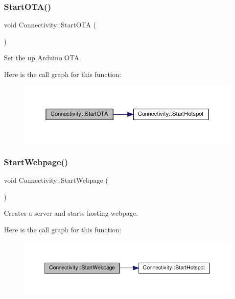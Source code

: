 \subsubsection{\texorpdfstring{Start\+O\+T\+A()}{StartOTA()}}
{\footnotesize\ttfamily void Connectivity\+::\+Start\+O\+TA (\begin{DoxyParamCaption}{ }\end{DoxyParamCaption})}



Set the up Arduino O\+TA. 

Here is the call graph for this function\+:
\nopagebreak
\begin{figure}[H]
\begin{center}
\leavevmode
\includegraphics[width=350pt]{classConnectivity_a08efeeef7c1096e4244224846f70f04c_cgraph}
\end{center}
\end{figure}
\mbox{\label{classConnectivity_a72b0edad6e98830701aea73f90efd5b0}} 
\subsubsection{\texorpdfstring{Start\+Webpage()}{StartWebpage()}}
{\footnotesize\ttfamily void Connectivity\+::\+Start\+Webpage (\begin{DoxyParamCaption}{ }\end{DoxyParamCaption})}



Creates a server and starts hosting webpage. 

Here is the call graph for this function\+:
\nopagebreak
\begin{figure}[H]
\begin{center}
\leavevmode
\includegraphics[width=350pt]{classConnectivity_a72b0edad6e98830701aea73f90efd5b0_cgraph}
\end{center}
\end{figure}
\mbox{\label{classConnectivity_a8d01492828472cc2edf8af89682b40e9}} 
